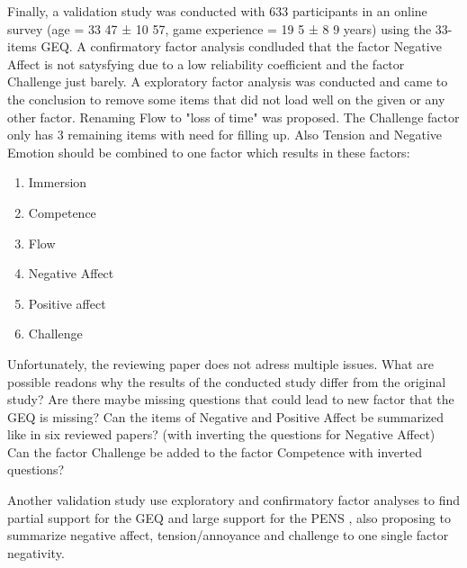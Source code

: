 Finally, a validation study was conducted with 633 participants in an online survey (age = 33 47 ± 10 57, game experience = 19 5 ± 8 9 years) using the 33-items GEQ. A confirmatory factor analysis condluded that the factor Negative Affect is not satysfying due to a low reliability coefficient and the factor Challenge just barely. A exploratory factor analysis was conducted and came to the conclusion to remove some items that did not load well on the given or any other factor. Renaming Flow to "loss of time" was proposed. The Challenge factor only has 3 remaining items with need for filling up. Also Tension and Negative Emotion should be combined to one factor which results in these factors:
\begin{enumerate}
	\item Immersion
	\item Competence
	\item Flow
	\item Negative Affect
	\item Positive affect
	\item Challenge
\end{enumerate}

Unfortunately, the reviewing paper does not adress multiple issues.
What are possible readons why the results of the conducted study differ from the original study?
Are there maybe missing questions that could lead to new factor that the GEQ is missing?
Can the items of Negative and Positive Affect be summarized like in six reviewed papers? (with inverting the questions for Negative Affect)
Can the factor Challenge be added to the factor Competence with inverted questions?

Another validation study use exploratory and confirmatory factor analyses to find partial support for the GEQ and large support for the PENS \cite{johnson2018validation}, also proposing to summarize negative affect, tension/annoyance and challenge to one single factor negativity.
	

